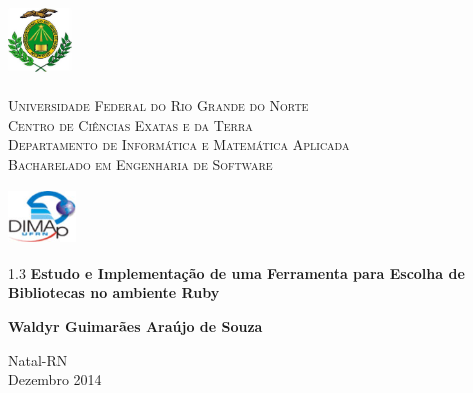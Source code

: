 
\begin{titlepage}
	\begin{center}
		
		\begin{minipage}{2cm}
			\begin{center}
				\includegraphics[width=1.7cm, height=2.0cm]{Imagens/Brasao-UFRN.jpg}
			\end{center}
		\end{minipage}
		\begin{minipage}{11cm}
			\begin{center}
				\begin{espacosimples}
					{\small \textsc{Universidade Federal do Rio Grande do Norte}			\\
							  \textsc{Centro de Ciências Exatas e da Terra}						\\
							  \textsc{Departamento de Informática e Matemática Aplicada}	\\
							  \textsc{Bacharelado em Engenharia de Software}}
				\end{espacosimples}
			\end{center}
		\end{minipage}
		\begin{minipage}{2cm}
			\begin{center}
				\includegraphics[width=1.8cm, height=1.5cm]{Imagens/Logotipo-DIMAp.jpg}
			\end{center}
		\end{minipage}
			
		\vspace{5cm}
						
		{\setlength{\baselineskip}%
		{1.3\baselineskip}
		{\LARGE \textbf{Estudo e Implementação de uma Ferramenta para Escolha de Bibliotecas no ambiente Ruby}}\par}
			
		\vspace{4cm}
			
		{\large \textbf{Waldyr Guimarães Araújo de Souza}}
						
		\vspace{7cm}
		
		Natal-RN\\Dezembro 2014
	\end{center}
\end{titlepage}